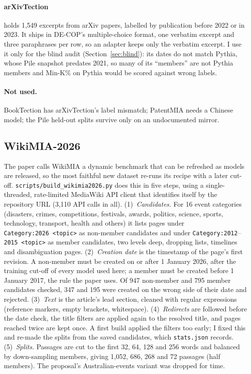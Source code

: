 \documentclass[11pt]{article}
\begin{document}
\paragraph{arXivTection} \citep{duarte2024decop} holds 1,549 excerpts from arXiv papers, labelled by publication before 2022 or in 2023. It ships in DE-COP's multiple-choice format, one verbatim excerpt and three paraphrases per row, so an adapter keeps only the verbatim excerpt. I use it only for the blind audit (Section~\ref{sec:blind}): its dates do not match Pythia, whose Pile snapshot predates 2021, so many of its ``members'' are not Pythia members and Min-K\% on Pythia would be scored against wrong labels.

\paragraph{Not used.} BookTection has arXivTection's label mismatch; PatentMIA needs a Chinese model; the Pile held-out splits survive only on an undocumented mirror.

\subsection{WikiMIA-2026}
\label{sec:wikimia2026}

The paper calls WikiMIA a dynamic benchmark that can be refreshed as models are released, so the most faithful new dataset re-runs its recipe with a later cut-off. \texttt{scripts/build\_wikimia2026.py} does this in five steps, using a single-threaded, rate-limited MediaWiki API client that identifies itself by the repository URL (3,110 API calls in all).
(1)~\emph{Candidates.} For 16 event categories (disasters, crimes, competitions, festivals, awards, politics, science, sports, technology, transport, health and others) it lists pages under \texttt{Category:2026~<topic>} as non-member candidates and under \texttt{Category:2012}--\texttt{2015~<topic>} as member candidates, two levels deep, dropping lists, timelines and disambiguation pages.
(2)~\emph{Creation date} is the timestamp of the page's first revision. A non-member must be created on or after 1 January 2026, after the training cut-off of every model used here; a member must be created before 1 January 2017, the rule the paper uses. Of 947 non-member and 795 member candidates checked, 347 and 195 were created on the wrong side of their date and rejected.
(3)~\emph{Text} is the article's lead section, cleaned with regular expressions (reference markers, empty brackets, whitespace).
(4)~\emph{Redirects} are followed before the date check, the title filters are applied again to the resolved title, and pages reached twice are kept once. A first build applied the filters too early; I fixed this and re-made the splits from the saved candidates, which \texttt{stats.json} records.
(5)~\emph{Splits.} Passages are cut to the first 32, 64, 128 and 256 words and balanced by down-sampling members, giving 1,052, 686, 268 and 72 passages (half members). The proposal's Australian-events variant was dropped for time.
\end{document}
